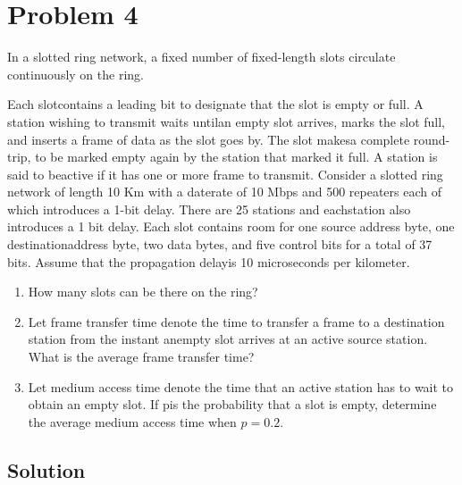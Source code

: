 
\section*{Problem 4}

In a slotted ring network, a fixed number of fixed-length slots circulate continuously on the ring.

Each slotcontains a leading bit to designate that the slot is empty or full.
A station wishing to transmit waits untilan empty slot arrives, marks the slot full, and inserts a frame of data as the slot goes by.
The slot makesa complete round-trip, to be marked empty again by the station that marked it full.
A station is said to beactive if it has one or more frame to transmit. Consider a slotted ring network of length 10 Km with a daterate of 10 Mbps and 500 repeaters each of which introduces a 1-bit delay.
There are 25 stations and eachstation also introduces a 1 bit delay.
Each slot contains room for one source address byte, one destinationaddress byte, two data bytes, and five control bits for a total of 37 bits.
Assume that the propagation delayis 10 microseconds per kilometer.

\begin{enumerate}
    \item How many slots can be there on the ring?
    \item Let frame transfer time denote the time to transfer a frame to a destination station from the instant anempty slot arrives at an active source station. What is the average frame transfer time?
    \item Let medium access time denote the time that an active station has to wait to obtain an empty slot.
          If pis the probability that a slot is empty, determine the average medium access time when $p = 0.2$.
\end{enumerate}

\subsection*{Solution}
